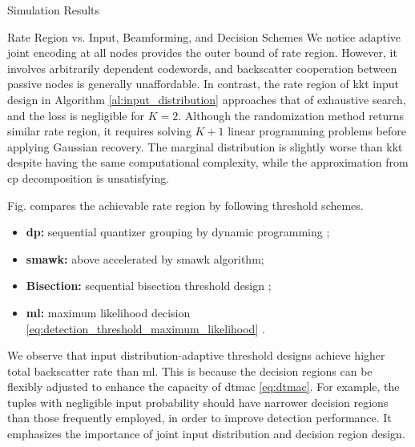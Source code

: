 \documentclass[journal]{IEEEtran}
\begin{document}
\begin{section}{Simulation Results}
\begin{subsection}{Rate Region vs. Input, Beamforming, and Decision Schemes}
		We notice adaptive joint encoding at all nodes provides the outer bound of rate region.
		However, it involves arbitrarily dependent codewords, and backscatter cooperation between passive nodes is generally unaffordable.
		In contrast, the rate region of \gls{kkt} input design in Algorithm \ref{al:input_distribution} approaches that of exhaustive search, and the loss is negligible for $K=2$.
		Although the randomization method \cite{Calvo2010} returns similar rate region, it requires solving $K+1$ linear programming problems before applying Gaussian recovery.
		The marginal distribution is slightly worse than \gls{kkt} despite having the same computational complexity, while the approximation from \gls{cp} decomposition is unsatisfying.


		Fig.  compares the achievable rate region by following threshold schemes.
		\begin{itemize}
			\item \textbf{\gls{dp}:} sequential quantizer grouping by dynamic programming \cite{He2021};
			\item \textbf{\gls{smawk}:} above accelerated by \gls{smawk} algorithm;
			\item \textbf{Bisection:} sequential bisection threshold design \cite{Nguyen2020a};
			\item \textbf{\gls{ml}:} maximum likelihood decision \eqref{eq:detection_threshold_maximum_likelihood} \cite{Qian2019}.
		\end{itemize}

		We observe that input distribution-adaptive threshold designs achieve higher total backscatter rate than \gls{ml}.
		This is because the decision regions can be flexibly adjusted to enhance the capacity of \gls{dtmac} \eqref{eq:dtmac}.
		For example, the tuples with negligible input probability should have narrower decision regions than those frequently employed, in order to improve detection performance.
		It emphasizes the importance of joint input distribution and decision region design.

	\end{subsection}



\end{section}
\end{document}
